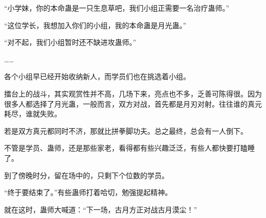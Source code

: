 \begin{this_body}
“小学妹，你的本命蛊是一只生息草吧，我们小组正需要一名治疗蛊师。”

“这位学长，我想加入你们的小组，我的本命蛊是月光蛊。”

“对不起，我们小组暂时还不缺进攻蛊师。”

……

各个小组早已经开始收纳新人，而学员们也在挑选着小组。

擂台上的战斗，其实观赏性并不高，几场下来，亮点也不多，乏善可陈得很。因为很多人都选择了月光蛊，一般而言，双方对战，首先都是月刃对射。往往谁的真元耗尽，谁就失败。

若是双方真元都同时不济，那就比拼拳脚功夫。总之最终，总会有一人倒下。

不管是学员、蛊师，还是那些家老，看得都有些兴趣泛泛，有些人都快要打瞌睡了。

到了傍晚时分，留在场中的，只剩下个位数的学员。

“终于要结束了。”有些蛊师打着哈切，勉强提起精神。

就在这时，蛊师大喊道：“下一场，古月方正对战古月漠尘！”

\end{this_body}

